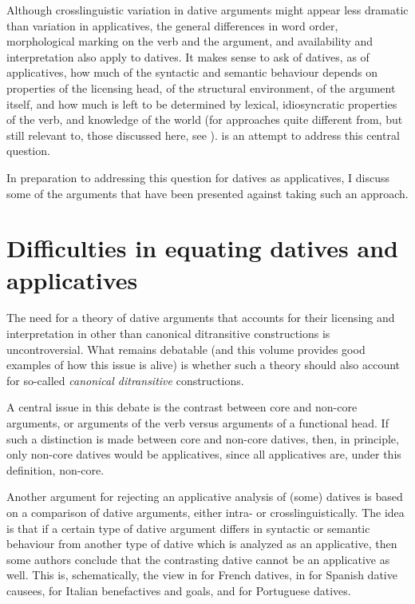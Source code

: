 \documentclass[output=paper,colorlinks,citecolor=brown,modfonts,nonflat]{langsci/langscibook}
\begin{document}
Although crosslinguistic variation in dative arguments might appear less dramatic than variation in applicatives, the general differences in word order, morphological marking on the verb and the argument, and availability and interpretation also apply to datives. It makes sense to ask of datives, as of applicatives, how much of the syntactic and semantic behaviour depends on properties of the licensing head, of the structural environment, of the argument itself, and how much is left to be determined by lexical, idiosyncratic properties of the verb, and knowledge of the world (for approaches quite different from, but still relevant to, those discussed here, see \citealt{Grimm2011, Maling2001}).  is an attempt to address this central question.

In preparation to addressing this question for datives as applicatives, I discuss some of the arguments that have been presented against taking such an approach.

\largerpage
\section{Difficulties in equating datives and applicatives}\label{sec:cuervo:2}

The need for a theory of dative arguments that accounts for their licensing and interpretation in other than canonical ditransitive constructions is uncontroversial. What remains debatable (and this volume provides good examples of how this issue is alive) is whether such a theory should also account for so-called \textit{canonical ditransitive} constructions.

A central issue in this debate is the contrast between core and non-core arguments, or arguments of the verb versus arguments of a functional head. If such a distinction is made between core and non-core datives, then, in principle, only non-core datives would be applicatives, since all applicatives are, under this definition, non-core.

Another argument for rejecting an applicative analysis of (some) datives is based on a comparison of dative arguments, either intra- or crosslinguistically. The idea is that if a certain type of dative argument differs in syntactic or semantic behaviour from another type of dative which is analyzed as an applicative, then some authors conclude that the contrasting dative cannot be an applicative as well. This is, schematically, the view in \citet{BonehNash2012} for French datives, in \citet{Tubino2012} for Spanish dative causees, \citet{FolliHarley2006} for Italian benefactives and goals, and  for Portuguese datives.
\end{document}

